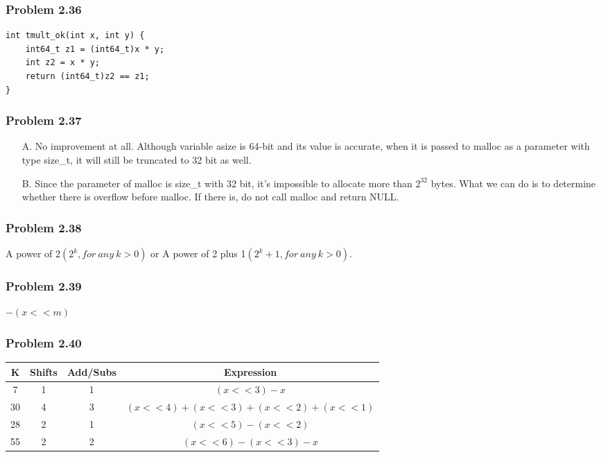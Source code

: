 \documentclass[a4paper]{article}
\begin{document}
\subsubsection*{Problem 2.36}
\begin{lstlisting}
int tmult_ok(int x, int y) {
    int64_t z1 = (int64_t)x * y;
    int z2 = x * y;
    return (int64_t)z2 == z1;
}
\end{lstlisting}

\subsubsection*{Problem 2.37}
\begin{enumerate}
    \item [A.] No improvement at all. Although variable asize is 64-bit and its value is accurate, when it is passed to malloc as a parameter with type size\_t, it will still be truncated to 32 bit as well.
    \item [B.] Since the parameter of malloc is size\_t with 32 bit, it's impossible to allocate more than $2^{32}$ bytes. What we can do is to determine whether there is overflow before malloc. If there is, do not call malloc and return NULL.
\end{enumerate}

\subsubsection*{Problem 2.38}
A power of 2$(2^k, for\ any\ k > 0)$ or A power of 2 plus 1$(2^k+1, for\ any\ k > 0)$.

\subsubsection*{Problem 2.39}
$-(x<<m)$

\subsubsection*{Problem 2.40}
\begin{tabular}{cccc}
    K&Shifts&Add/Subs&Expression\\
    \hline
    7&1&1&$(x<<3)-x$\\
    30&4&3&$(x<<4)+(x<<3)+(x<<2)+(x<<1)$\\
    28&2&1&$(x<<5)-(x<<2)$\\
    55&2&2&$(x<<6)-(x<<3)-x$\\
\end{tabular}
\end{document}
